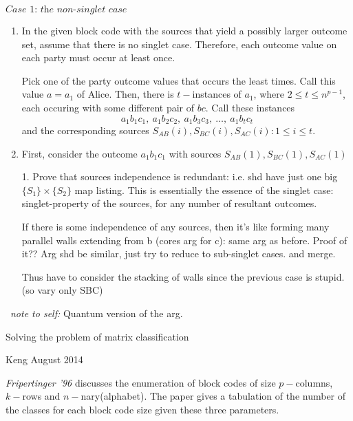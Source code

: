 \documentclass[12pt]{article}  %
\begin{document}
\begin{enumerate}
$\textit{Case 1: the non-singlet case}$

\begin{enumerate}

\item In the given block code with the sources that yield a possibly larger outcome set, assume that there is no singlet case. Therefore, each outcome value on each party must occur at least once.


Pick one of the party outcome values that occurs the least times. Call this value $a=a_1$ of Alice. Then, there is $t-$instances of $a_1$, where $2 \leq t \leq n^{p-1}$, each occuring with some different pair of $bc$. Call these instances 
$$a_1 b_1 c_1, \ a_1 b_2 c_2, \ a_1 b_3 c_3, \  \dots, \ a_1 b_t c_t $$ 
and the corresponding sources $S_{AB}(i),S_{BC}(i),S_{AC}(i) : 1 \leq i \leq t$.


\item First, consider the outcome $a_1 b_1 c_1$ with sources $S_{AB}(1), S_{BC}(1), S_{AC}(1)$


1. Prove that sources independence is redundant: i.e. shd have just one big $\{S_1\} \times \{S_2\}$ map listing. This is essentially the essence of the singlet case: singlet-property of the sources, for any number of resultant outcomes.


If there is some independence of any sources, then it's like forming many parallel walls extending from b (cores arg for c): same arg as before. Proof of it?? Arg shd be similar, just try to reduce to sub-singlet cases. and merge.



Thus have to consider the stacking of walls since the previous case is stupid. (so vary only SBC)


\end{enumerate}





\
\textit{note to self:} Quantum version of the arg.






\end{enumerate}






{\Large \centerline{Solving the problem of matrix classification}}

{\centerline {Keng \quad August 2014}}


\textit{Fripertinger '96} discusses the enumeration of block codes of size $p-$columns, $k-$rows and $n-$nary(alphabet). The paper gives a tabulation of the number of the classes for each block code size given these three parameters.
\end{document}
